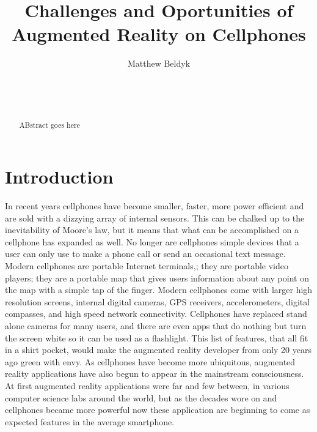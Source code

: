 \documentclass{acm_proc_article-sp}
\begin{document}
\title{Challenges and Oportunities of Augmented Reality on Cellphones}

%
\author{
\alignauthor
Matthew Beldyk\\
\\
\\
\\
}
\maketitle
\begin{abstract}
ABstract goes here
\end{abstract}

\section{Introduction}
In recent years cellphones have become smaller, faster, more power efficient and are sold with a dizzying array of internal sensors.  This can be chalked up to the inevitability of Moore's law, but it means that what can be accomplished on a cellphone has expanded as well.  No longer are cellphones simple devices that a user can only use to  make a phone call or send an occasional text message. Modern cellphones are portable Internet terminals,; they are portable video players; they are a portable map that gives users information about any point on the map with a simple tap of the finger.  Modern cellphones come with larger high resolution screens, internal digital cameras, GPS receivers, accelerometers, digital compasses, and high speed network connectivity. Cellphones have replaced stand alone cameras for many users, and there are even apps that do nothing but turn the screen white so it can be used as a flashlight. This list of features, that all fit in a shirt pocket, would make the augmented reality developer from only 20 years ago green with envy.  As cellphones have become more ubiquitous, augmented reality applications have also begun to appear in the mainstream consciousness.  At first augmented reality applications were far and few between, in various computer science labs around the world, but as the decades wore on and cellphones became more powerful now these application are beginning to come as expected features in the average smartphone.  
\end{document}
